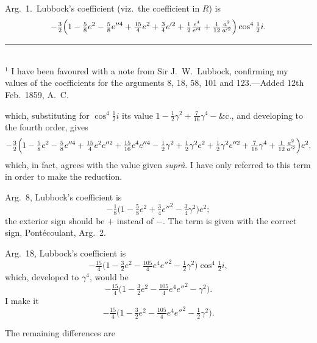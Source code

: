 \documentclass[12pt,a4paper]{article}
\theoremstyle{plain}
\begin{document}
\medskip

\noindent Arg.~1.\ Lubbock's coefficient (viz.\ the coefficient in $R$) is
\[
-\tfrac{3}{2}\Bigl(1-\tfrac{5}{8}e^{2}-\tfrac{5}{8}e''^{4}+\tfrac{15}{4}e^{2}+\tfrac{3}{4}e'^{2}+\tfrac{1}{2}\tfrac{e^{4}}{e'^{4}}+\tfrac{1}{12}\tfrac{a^{2}}{a'^{2}}\Bigr)\cos^{4}\tfrac{1}{2}i.
\]

\medskip
\noindent\rule{6cm}{0.4pt}\\[0.3em]
\noindent\small $^{1}$ I have been favoured with a note from Sir J.~W.\ Lubbock, confirming my values of the coefficients for the arguments 8, 18, 58, 101 and 123.---Added 12th Feb.\ 1859, A.~C.

\newpage
{} which, substituting for $\cos^{4}\tfrac{1}{2}i$ its value $1-\tfrac{1}{2}\gamma^{2}+\tfrac{7}{16}\gamma^{4}-\&\mathrm{c}$., and developing to the fourth order, gives
\[
-\tfrac{3}{2}\Bigl(1-\tfrac{5}{8}e^{2}-\tfrac{5}{8}e''^{4}+\tfrac{15}{4}e^{2}e''^{2}+\tfrac{15}{16}e^{4}e''^{4}-\tfrac{1}{2}\gamma^{2}+\tfrac{1}{2}\gamma^{2}e^{2}+\tfrac{1}{2}\gamma^{2}e''^{2}+\tfrac{7}{16}\gamma^{4}+\tfrac{1}{12}\tfrac{a^{2}}{a'^{2}}\Bigr)e^{2},
\]
which, in fact, agrees with the value given \textit{supr\`a}. I have only referred to this term in order to make the reduction.

\medskip

\noindent Arg.~8, Lubbock's coefficient is
\[
-\tfrac{1}{8}\bigl(1-\tfrac{5}{8}e^{2}+\tfrac{3}{4}e''^{2}-\tfrac{3}{4}\gamma^{2}\bigr)e^{2};
\]
the exterior sign should be $+$ instead of $-$. The term is given with the correct sign, Pont\'ecoulant, Arg.~2.

\medskip

\noindent Arg.~18, Lubbock's coefficient is
\[
-\tfrac{15}{4}\bigl(1-\tfrac{3}{2}e^{2}-\tfrac{105}{4}e^{4}e''^{2}-\tfrac{1}{2}\gamma^{2}\bigr)\cos^{4}\tfrac{1}{2}i,
\]
which, developed to $\gamma^{4}$, would be
\[
-\tfrac{15}{4}\bigl(1-\tfrac{3}{2}e^{2}-\tfrac{105}{4}e^{4}e''^{2}-\gamma^{2}\bigr).
\]
I make it
\[
-\tfrac{15}{4}\bigl(1-\tfrac{3}{2}e^{2}-\tfrac{105}{4}e^{4}e''^{2}-\tfrac{1}{2}\gamma^{2}\bigr).
\]

\medskip

The remaining differences are
\end{document}
